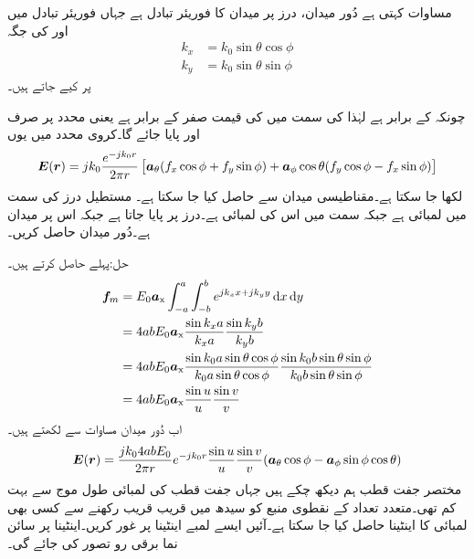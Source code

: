 مساوات  کہتی ہے دُور میدان، درز پر میدان کا فوریئر تبادل ہے جہاں فوریئر تبادل میں  اور  کی جگہ  
\begin{align*}
k_x&=k_0\sin\theta\cos\phi \\
k_y&=k_0\sin\theta\sin\phi
\end{align*}
 پر کیے جاتے ہیں۔

چونکہ  کے برابر ہے لہٰذا  کی سمت میں  کی قیمت صفر کے برابر ہے یعنی  محدد پر صرف  اور  پایا جائے گا۔کروی محدد میں یوں
\begin{align}\label{مساوات_اینٹینا_دور_میدان_بذریعہ_فوریئر_بدل}
{\ensuremath{{\boldsymbol{E}}}}({{\boldsymbol{r}}})=j k_0 \frac{e^{-j k_0 r}}{2\pi r}\left[{\boldsymbol{a}}_{\theta} (f_x \cos\phi+f_y \sin\phi)+{\boldsymbol{a}}_{\phi} \cos \theta (f_y\cos\phi-f_x\sin\phi) \right]
\end{align}
لکھا جا سکتا ہے۔مقناطیسی میدان  سے حاصل کیا جا سکتا ہے۔
مستطیل درز کی  سمت میں لمبائی  ہے جبکہ  سمت میں اس کی لمبائی  ہے۔درز  پر پایا جاتا  ہے جبکہ اس پر
 میدان  ہے۔دُور میدان حاصل کریں۔

حل:پہلے  حاصل کرتے ہیں۔
\begin{align*}
\kvec{f}_m&=E_0 \ax \int_{-a}^{a}\int_{-b}^{b} e^{j k_x x +j k_y y} \dif x \dif y\\
&=4 a b E_0 \ax \frac{\sin k_x a}{k_x a}\frac{\sin k_y b}{k_y b}\\
&=4 a b E_0 \ax \frac{\sin k_0 a \sin \theta \cos \phi}{k_0 a\sin \theta \cos \phi}\frac{\sin k_0 b \sin \theta \sin\phi}{k_0 b\sin\theta\sin\phi}\\
&=4 a b E_0 \ax \frac{\sin u}{u} \frac{\sin v}{v}
\end{align*}
اب دُور میدان مساوات  سے لکھتے ہیں۔
\begin{align*}
{\ensuremath{{\boldsymbol{E}}}}({{\boldsymbol{r}}})=\frac{j k_0 4 a bE_0}{2\pi r}e^{-j k_0 r}\frac{\sin u}{u}\frac{\sin v}{v} ({\boldsymbol{a}}_{\theta} \cos\phi-{\boldsymbol{a}}_{\phi} \sin\phi\cos\theta)
\end{align*}
مختصر جفت قطب ہم دیکھ چکے ہیں جہاں جفت قطب کی لمبائی طول موج سے بہت کم  تھی۔متعدد تعداد کے نقطوی منبع کو سیدھ میں قریب قریب رکھنے سے کسی بھی لمبائی کا اینٹینا حاصل کیا جا سکتا ہے۔آئیں ایسے لمبے اینٹینا پر غور کریں۔اینٹینا پر سائن نما برقی رو تصور کی جائے گی۔

